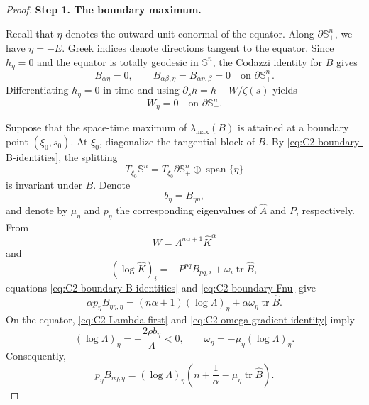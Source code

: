 \documentclass[11pt, reqno]{amsart}
\theoremstyle{remark}
\theoremstyle{definition}
\numberwithin{equation}{section}
\DeclareMathOperator{\tr}{tr}
\begin{document}
\begin{proof}
\medskip
\noindent\textbf{Step 1. The boundary maximum.}

Recall that $\eta$ denotes the outward unit conormal of the
equator. Along $\partial\mathbb S^n_+$, we have $\eta=-E$.
Greek indices denote directions tangent to the equator. Since
$h_\eta=0$ and the equator is totally geodesic in $\mathbb S^n$,
the Codazzi identity for $B$ gives
\begin{equation}\label{eq:C2-boundary-B-identities}
        B_{\alpha\eta}=0,
        \qquad
        B_{\alpha\beta,\eta}
        =B_{\alpha\eta,\beta}=0
        \quad\text{on }\partial\mathbb S^n_+.
\end{equation}
Differentiating $h_\eta=0$ in time and using $\partial_sh=h-{W}/{\zeta(s)}$ 
yields
\begin{equation}\label{eq:C2-boundary-Fnu}
        W_\eta=0
        \quad\text{on }\partial\mathbb S^n_+.
\end{equation}

Suppose that the space-time maximum of
$\lambda_{\max}(B)$ is attained at a boundary point
$(\xi_0,s_0)$. At $\xi_0$, diagonalize the tangential block of
$B$. By \eqref{eq:C2-boundary-B-identities}, the splitting
\begin{equation*}
        T_{\xi_0}\mathbb S^n
        =
        T_{\xi_0}\partial\mathbb S^n_+
        \oplus\operatorname{span}\{\eta\}
\end{equation*}
is invariant under $B$. Denote
\begin{equation*}
        b_\eta=B_{\eta\eta},
\end{equation*}
and denote by $\mu_\eta$ and $p_\eta$ the corresponding
eigenvalues of $\widehat A$ and $P$, respectively. From
\begin{equation*}
        W=\Lambda^{n\alpha+1}\widehat K^\alpha
\end{equation*}
and
\begin{equation*}
        (\log\widehat K)_i
        =
        -P^{pq}B_{pq,i}
        +\omega_i\tr\widehat B,
\end{equation*}
equations \eqref{eq:C2-boundary-B-identities} and
\eqref{eq:C2-boundary-Fnu} give
\begin{equation*}
        \alpha p_\eta B_{\eta\eta,\eta}
        =
        (n\alpha+1)(\log\Lambda)_\eta
        +\alpha\omega_\eta\tr\widehat B.
\end{equation*}
On the equator, \eqref{eq:C2-Lambda-first} and
\eqref{eq:C2-omega-gradient-identity} imply
\begin{equation*}
        (\log\Lambda)_\eta
        =
        -\frac{2\rho b_\eta}{\Lambda}<0,
        \qquad
        \omega_\eta
        =
        -\mu_\eta(\log\Lambda)_\eta.
\end{equation*}
Consequently,
\begin{equation}\label{eq:C2-boundary-normal-eigenvalue}
        p_\eta B_{\eta\eta,\eta}
        =
        (\log\Lambda)_\eta
        \left(
            n+\frac1\alpha
            -\mu_\eta\tr\widehat B
        \right).
\end{equation}


\end{proof}
\end{document}

